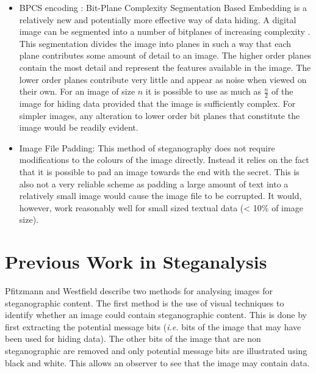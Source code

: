\begin{itemize}
\item BPCS encoding : Bit-Plane Complexity Segmentation Based Embedding is a relatively new and potentially more effective way of data hiding.  A digital image can be segmented into a number of bitplanes of increasing complexity \cite{kawaguchi1998concept}. This segmentation divides the image into planes in such a way that each plane contributes some amount of detail to an image. The higher order planes contain the most detail and represent the features available in the image. The lower order planes contribute very little and appear as noise when viewed on their own.  For an image of size $n$ it is possible to use as much as $\frac{n}{2}$ of the image for hiding data provided that the image is sufficiently complex. For simpler images, any alteration to lower order bit planes that constitute the image would be readily evident.
\item Image File Padding: This method of steganography does not require modifications to the colours of the image directly. Instead it relies on the fact that it is possible to pad an image towards the end with the secret. This is also not a very reliable scheme as padding a large amount of text into a relatively small image would cause the image file to be corrupted. It would, however, work reasonably well for small sized textual data (< 10\% of image size).
\end{itemize}
\section{Previous Work in Steganalysis}
\label{sec:theory}
Pfitzmann and Westfield \cite{westfeld2000attacks} describe two methods for analysing images for steganographic content. The first method is the use of visual techniques to identify whether an image could contain steganographic content.  This is done by first extracting the potential message bits (\emph{i.e.} bits of the image that may have been used for hiding data). The other bits of the image that are non steganographic are removed and only potential message bits are illustrated using black and white. This allows an observer to see that the image may contain data.

